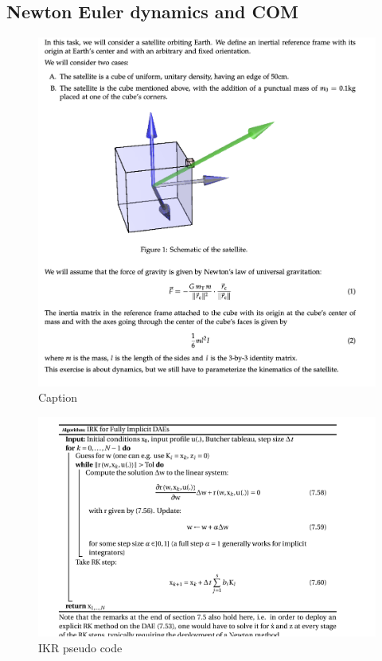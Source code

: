 \subsection{Newton Euler dynamics and COM}

\begin{figure}[H]
    \centering
    \includegraphics[scale = 0.5]{Skjermbilde 2024-05-23 kl. 18.56.18.png}
    \caption{Caption}
    \label{fig:enter-label}
\end{figure}

\begin{figure}[H]
    \centering
    \includegraphics[scale = 0.5]{figures/IRK psedo code.png}
    \caption{IKR pseudo code}
\end{figure}

